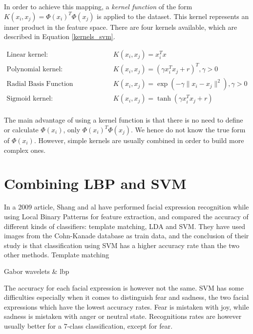 \noindent In order to achieve this mapping, a \textit{kernel function} of the form $K(x_i, x_j) = \Phi(x_i)^T \Phi(x_j)$ is applied to the dataset. This kernel represents an inner product in the feature space. There are four kernels available, which are described in Equation \ref{kernels_svm}.
\newline

\begin{equation}
\begin{array}{ll}
	\text{Linear kernel:} & K(x_i,x_j) = x_i^Tx \\
	\text{Polynomial kernel:} & K(x_i,x_j) = (\gamma x_i^Tx_j + r)^T, \gamma > 0 \\
	\text{Radial Basis Function (Gaussian) kernel:} & K(x_i,x_j) = \exp(-\gamma \| x_i - x_j \|^2), \gamma > 0 \\
	\text{Sigmoid kernel:} & K(x_i,x_j) = \tanh(\gamma x_i^T x_j + r)\\
\end{array}
\label{kernels_svm}
\end{equation}

\vspace{\baselineskip}

\noindent The main advantage of using a kernel function is that there is no need to define or calculate $\Phi(x_i)$, only $\Phi(x_i)^T \Phi(x_j)$. We hence do not know the true form of $\Phi(x_i)$. However, simple kernels are usually combined in order to build more complex ones.
\newline

\section{Combining LBP and SVM}

\vspace{\baselineskip}
\noindent In a 2009 article, Shang and al \cite{SHA09} have performed facial expression recognition while using Local Binary Patterns for feature extraction, and compared the accuracy of different kinds of classifiers:  template matching,  LDA and SVM. They have used images from the Cohn-Kanade database as train data, and the conclusion of their study is that classification using SVM has a higher accuracy rate than the two other methods. Template matching 
\newline

\noindent Gabor wavelets & lbp
\newline

\noindent The accuracy for each facial expression is however not the same. SVM has some difficulties especially when it comes to distinguish fear and sadness, the two facial expressions which have the lowest accuracy rates. Fear is mistaken with joy, while sadness is mistaken with anger or neutral state. Recognitions rates are however usually better for a 7-class classification, except for fear.
\newline

